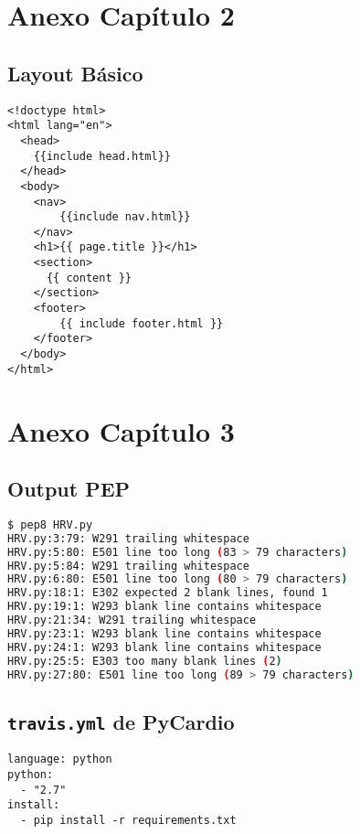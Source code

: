 
\appendix

\chapter{Anexo Capítulo 2}

\section{Layout Básico}
\begin{lstlisting}[style=htmlcssjs,caption=Layout Básico]
<!doctype html>
<html lang="en">
  <head>
    {{include head.html}}
  </head>
  <body>
    <nav>
        {{include nav.html}}
    </nav>
    <h1>{{ page.title }}</h1>
    <section>
      {{ content }}
    </section>
    <footer>
        {{ include footer.html }}
    </footer>
  </body>
</html>
\end{lstlisting}

\chapter{Anexo Capítulo 3}

\section{Output PEP}

\begin{lstlisting}[language=sh, caption=Ejemplo de PEP8 con \emph{PyCardio},label={code:pep8}]
$ pep8 HRV.py
HRV.py:3:79: W291 trailing whitespace
HRV.py:5:80: E501 line too long (83 > 79 characters)
HRV.py:5:84: W291 trailing whitespace
HRV.py:6:80: E501 line too long (80 > 79 characters)
HRV.py:18:1: E302 expected 2 blank lines, found 1
HRV.py:19:1: W293 blank line contains whitespace
HRV.py:21:34: W291 trailing whitespace
HRV.py:23:1: W293 blank line contains whitespace
HRV.py:24:1: W293 blank line contains whitespace
HRV.py:25:5: E303 too many blank lines (2)
HRV.py:27:80: E501 line too long (89 > 79 characters)
\end{lstlisting}

\section{\texttt{travis.yml} de PyCardio}
\begin{lstlisting}[caption={\texttt{.travis.yml} de PyCardio},label=travisPyCardio]
language: python
python:
  - "2.7"
install:
  - pip install -r requirements.txt
\end{lstlisting}

